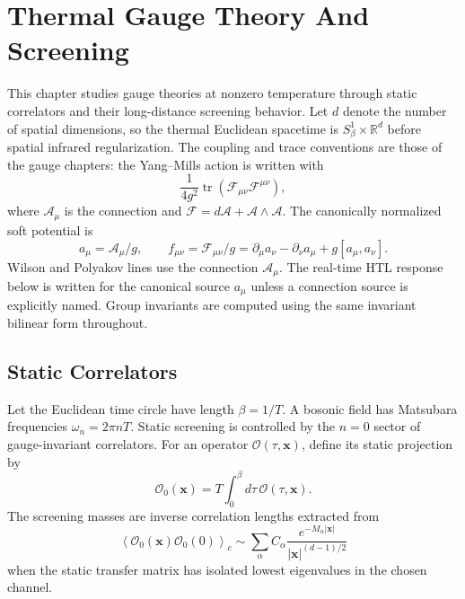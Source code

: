 \chapter{Thermal Gauge Theory And Screening}
\label{ch:thermal-gauge-theory-screening}

\ConventionsMixed

This chapter studies gauge theories at nonzero temperature through static
correlators and their long-distance screening behavior.  Let \(d\) denote
the number of spatial dimensions, so the thermal Euclidean spacetime is
\(S^1_\beta\times\mathbb R^d\) before spatial infrared regularization.  The
coupling and trace conventions are those of the gauge chapters: the
Yang--Mills action is written with
\[
  \frac{1}{4g^2}\operatorname{tr}
  (\mathcal F_{\mu\nu}\mathcal F^{\mu\nu}),
\]
where \(\mathcal A_\mu\) is the connection and
\(\mathcal F=d\mathcal A+\mathcal A\wedge\mathcal A\).  The
canonically normalized soft potential is
\[
  a_\mu=\mathcal A_\mu/g,\qquad
  f_{\mu\nu}=\mathcal F_{\mu\nu}/g
  =
  \partial_\mu a_\nu-\partial_\nu a_\mu+g[a_\mu,a_\nu].
\]
Wilson and Polyakov lines use the connection \(\mathcal A_\mu\).  The
real-time HTL response below is written for the canonical source \(a_\mu\)
unless a connection source is explicitly named.  Group invariants are computed
using the same invariant bilinear form throughout.

\section{Static Correlators}

Let the Euclidean time circle have length \(\beta=1/T\).  A bosonic field has
Matsubara frequencies \(\omega_n=2\pi nT\).  Static screening is controlled by
the \(n=0\) sector of gauge-invariant correlators.  For an operator
\(\mathcal O(\tau,\mathbf x)\), define its static projection by
\[
  \mathcal O_0(\mathbf x)=T\int_0^\beta d\tau\,\mathcal O(\tau,\mathbf x).
\]
The screening masses are inverse correlation lengths extracted from
\[
  \left\langle \mathcal O_0(\mathbf x)\mathcal O_0(0)\right\rangle_c
  \sim
  \sum_\alpha C_\alpha
  \frac{e^{-M_\alpha |\mathbf x|}}{|\mathbf x|^{(d-1)/2}}
\]
when the static transfer matrix has isolated lowest eigenvalues in the chosen
channel.

